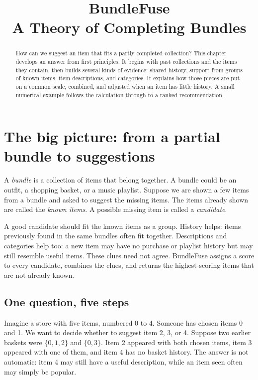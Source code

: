 \documentclass[11pt,a4paper]{article}
\title{\textcolor{ink}{BundleFuse}\\[5pt]\large A Theory of Completing Bundles}
\author{}\date{}
\numberwithin{equation}{section}
\begin{document}
\maketitle
\begin{abstract}
How can we suggest an item that fits a partly completed collection? This chapter develops
an answer from first principles. It begins with past collections and the items they contain,
then builds several kinds of evidence: shared history, support from groups of known items,
item descriptions, and categories. It explains how those pieces are put on a common scale,
combined, and adjusted when an item has little history. A small numerical example follows
the calculation through to a ranked recommendation.
\end{abstract}
\tableofcontents\clearpage
\section{The big picture: from a partial bundle to suggestions}
A \emph{bundle} is a collection of items that belong together. A bundle could be an outfit,
a shopping basket, or a music playlist. Suppose we are shown a few items from a bundle and
asked to suggest the missing items. The items already shown are called the \emph{known items}.
A possible missing item is called a \emph{candidate}.

A good candidate should fit the known items as a group. History helps: items previously
found in the same bundles often fit together. Descriptions and categories help too: a new
item may have no purchase or playlist history but may still resemble useful items. These
clues need not agree. BundleFuse assigns a score to every candidate, combines the clues,
and returns the highest-scoring items that are not already known.

\subsection{One question, five steps}
Imagine a store with five items, numbered 0 to 4. Someone has chosen items 0 and 1. We
want to decide whether to suggest item 2, 3, or 4. Suppose two earlier baskets were
$\{0,1,2\}$ and $\{0,3\}$. Item 2 appeared with both chosen items, item 3 appeared
with one of them, and item 4 has no basket history. The answer is not automatic: item 4
may still have a useful description, while an item seen often may simply be popular.
\end{document}
